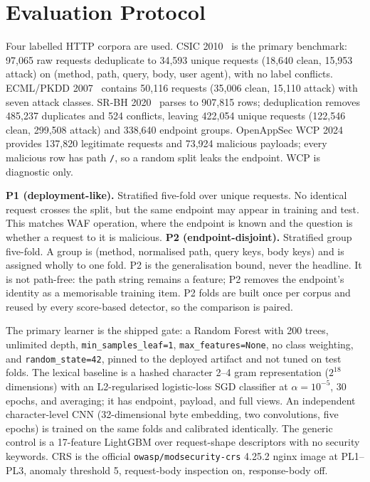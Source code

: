\documentclass[conference]{IEEEtran}
\newcommand{\feat}[1]{\texttt{#1}}
\begin{document}
\section{Evaluation Protocol}
\label{sec:protocol}
Four labelled HTTP corpora are used. CSIC 2010~\cite{csic2010dataset} is the primary benchmark: 97,065 raw requests deduplicate to 34,593 unique requests (18,640 clean, 15,953 attack) on (method, path, query, body, user agent), with no label conflicts. ECML/PKDD 2007~\cite{raissi2007web} contains 50,116 requests (35,006 clean, 15,110 attack) with seven attack classes. SR-BH 2020~\cite{srbh2020dataset} parses to 907,815 rows; deduplication removes 485,237 duplicates and 524 conflicts, leaving 422,054 unique requests (122,546 clean, 299,508 attack) and 338,640 endpoint groups. OpenAppSec WCP 2024~\cite{openappsec2024} provides 137,820 legitimate requests and 73,924 malicious payloads; every malicious row has path \texttt{/}, so a random split leaks the endpoint. WCP is diagnostic only.

\textbf{P1 (deployment-like).} Stratified five-fold over unique requests. No identical request crosses the split, but the same endpoint may appear in training and test. This matches WAF operation, where the endpoint is known and the question is whether a request to it is malicious. \textbf{P2 (endpoint-disjoint).} Stratified group five-fold. A group is (method, normalised path, query keys, body keys) and is assigned wholly to one fold. P2 is the generalisation bound, never the headline. It is not path-free: the path string remains a feature; P2 removes the endpoint's identity as a memorisable training item. P2 folds are built once per corpus and reused by every score-based detector, so the comparison is paired.

The primary learner is the shipped gate: a Random Forest with 200 trees, unlimited depth, \feat{min\_samples\_leaf=1}, \feat{max\_features=None}, no class weighting, and \feat{random\_state=42}, pinned to the deployed artifact and not tuned on test folds. The lexical baseline is a hashed character 2--4 gram representation ($2^{18}$ dimensions) with an L2-regularised logistic-loss SGD classifier at $\alpha=10^{-5}$, 30 epochs, and averaging; it has endpoint, payload, and full views. An independent character-level CNN (32-dimensional byte embedding, two convolutions, five epochs) is trained on the same folds and calibrated identically. The generic control is a 17-feature LightGBM over request-shape descriptors with no security keywords. CRS is the official \texttt{owasp/modsecurity-crs} 4.25.2 nginx image at PL1--PL3, anomaly threshold 5, request-body inspection on, response-body off.
\end{document}
